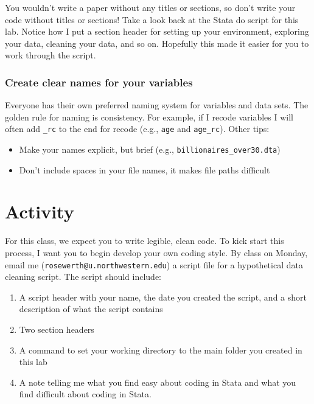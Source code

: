 \documentclass[
]{book}
\providecommand{\tightlist}{%
  \setlength{\itemsep}{0pt}\setlength{\parskip}{0pt}}
\begin{document}
You wouldn't write a paper without any titles or sections, so don't write your code without titles or sections! Take a look back at the Stata do script for this lab. Notice how I put a section header for setting up your environment, exploring your data, cleaning your data, and so on. Hopefully this made it easier for you to work through the script.

\hypertarget{create-clear-names-for-your-variables}{%
\subsubsection*{Create clear names for your variables}\label{create-clear-names-for-your-variables}}

Everyone has their own preferred naming system for variables and data sets. The golden rule for naming is consistency. For example, if I recode variables I will often add \texttt{\_rc} to the end for recode (e.g., \texttt{age} and \texttt{age\_rc}). Other tips:

\begin{itemize}
\tightlist
\item
  Make your names explicit, but brief (e.g., \texttt{billionaires\_over30.dta})
\item
  Don't include spaces in your file names, it makes file paths difficult
\end{itemize}

\hypertarget{activity}{%
\section{Activity}\label{activity}}

For this class, we expect you to write legible, clean code. To kick start this process, I want you to begin develop your own coding style. By class on Monday, email me (\texttt{rosewerth@u.northwestern.edu}) a script file for a hypothetical data cleaning script. The script should include:

\begin{enumerate}
\def\labelenumi{\arabic{enumi})}
\tightlist
\item
  A script header with your name, the date you created the script, and a short description of what the script contains
\item
  Two section headers
\item
  A command to set your working directory to the main folder you created in this lab
\item
  A note telling me what you find easy about coding in Stata and what you find difficult about coding in Stata.
\end{enumerate}
\end{document}
